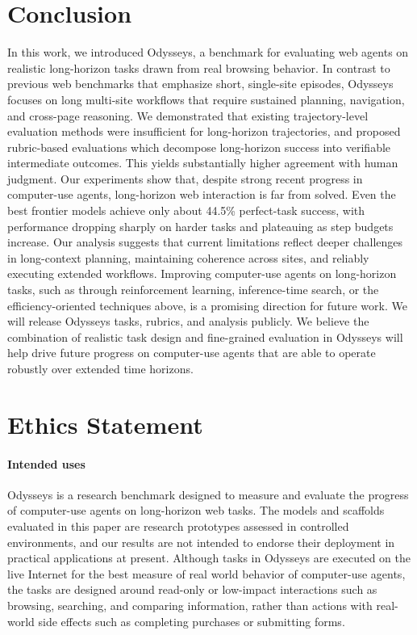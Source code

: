 \documentclass{article}
\theoremstyle{plain}
\theoremstyle{definition}
\theoremstyle{remark}
\def\odysseys{Odysseys\xspace}
\begin{document}
\section{Conclusion}

In this work, we introduced \odysseys, a benchmark for evaluating web agents on realistic long-horizon tasks drawn from real browsing behavior. In contrast to previous web benchmarks that emphasize short, single-site episodes, \odysseys focuses on long multi-site workflows that require sustained planning, navigation, and cross-page reasoning.
We demonstrated that existing trajectory-level evaluation methods were insufficient for long-horizon trajectories, and proposed rubric-based evaluations which decompose long-horizon success into verifiable intermediate outcomes. This yields substantially higher agreement with human judgment.
Our experiments show that, despite strong recent progress in computer-use agents, long-horizon web interaction is far from solved. Even the best frontier models achieve only about 44.5\% perfect-task success, with performance dropping sharply on harder tasks and plateauing as step budgets increase.
Our analysis suggests that current limitations reflect deeper challenges in long-context planning, maintaining coherence across sites, and reliably executing extended workflows. Improving computer-use agents on long-horizon tasks, such as through reinforcement learning, inference-time search, or the efficiency-oriented techniques above, is a promising direction for future work. We will release \odysseys tasks, rubrics, and analysis publicly. We believe the combination of realistic task design and fine-grained evaluation in \odysseys will help drive future progress on computer-use agents that are able to operate robustly over extended time horizons.


\section*{Ethics Statement}

\paragraph{Intended uses} \odysseys is a research benchmark designed to measure and evaluate the progress of computer-use agents on long-horizon web tasks. The models and scaffolds evaluated in this paper are research prototypes assessed in controlled environments, and our results are not intended to endorse their deployment in practical applications at present. Although tasks in \odysseys are executed on the live Internet for the best measure of real world behavior of computer-use agents, the tasks are designed around read-only or low-impact interactions such as browsing, searching, and comparing information, rather than actions with real-world side effects such as completing purchases or submitting forms.
\end{document}
